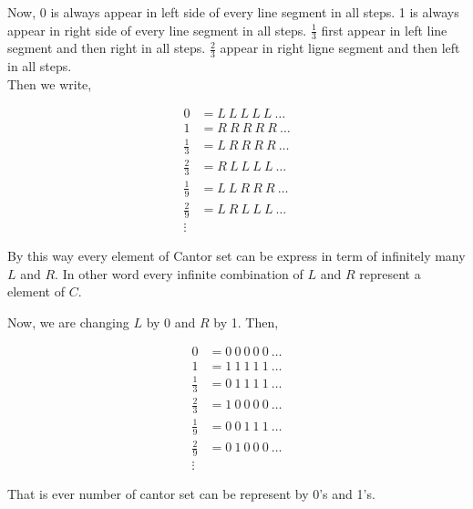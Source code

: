 Now, 0 is always appear in left side of every line segment in all steps. 1 is always appear in right side of every line segment in all steps.
$\frac{1}{3}$ first appear in left line segment and then right in all steps. $\frac{2}{3}$ appear in right ligne segment and then left in all steps.\\
Then we write,
\begin{center}
    \large
    \begin{align*}
        0&= L\ L\ L\ L\ L\ \ldots\\
        1&= R\ R\ R\ R\ R\ \ldots \\
        \frac{1}{3}&= L\ R\ R\ R\ R\ \ldots\\
        \frac{2}{3}&= R\ L\ L\ L\ L\ \ldots\\
        \frac{1}{9}&= L\ L\ R\ R\ R\ \ldots\\
        \frac{2}{9}&= L\ R\ L\ L\ L\ \ldots\\
        \vdots
    \end{align*}
\end{center}
By this way every element of Cantor set can be express in term of infinitely many $L$ and  $R$. In other word every infinite combination of  $L$ and  $R$ 
represent a element of  $C$.

Now, we are changing  $L$ by 0 and  $R$ by 1. Then,
\begin{center}
    \large
    \begin{align*}
        0&= 0\ 0\ 0\ 0\ 0\ \ldots\\
        1&= 1\ 1\ 1\ 1\ 1\ \ldots \\
        \frac{1}{3}&= 0\ 1\ 1\ 1\ 1\ \ldots\\
        \frac{2}{3}&= 1\ 0\ 0\ 0\ 0\ \ldots\\
        \frac{1}{9}&= 0\ 0\ 1\ 1\ 1\ \ldots\\
        \frac{2}{9}&= 0\ 1\ 0\ 0\ 0\ \ldots\\
        \vdots
    \end{align*}
\end{center}
That is ever number of cantor set can be represent by 0's and 1's. 

